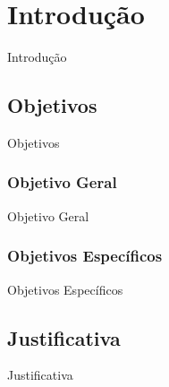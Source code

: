 

\section{Introdução}
    \label{sec:introducao}
    
    \begin{frame}{Introdução}
    
    \end{frame}
    
    \subsection{Objetivos}
        \label{subsec:objetivos}
        
        \begin{frame}{Objetivos}
            
        \end{frame}
        
        \subsubsection{Objetivo Geral}
            \label{subsubsec:objetivo-geral}
            
            \begin{frame}{Objetivo Geral}
                
            \end{frame}
            
        \subsubsection{Objetivos Específicos}
            \label{subsubsec:objetivos-especificos}
            
            \begin{frame}{Objetivos Específicos}
                
            \end{frame}
            
    \subsection{Justificativa}
        \label{subsec:justificativa}
        
        \begin{frame}{Justificativa}
            
        \end{frame}
